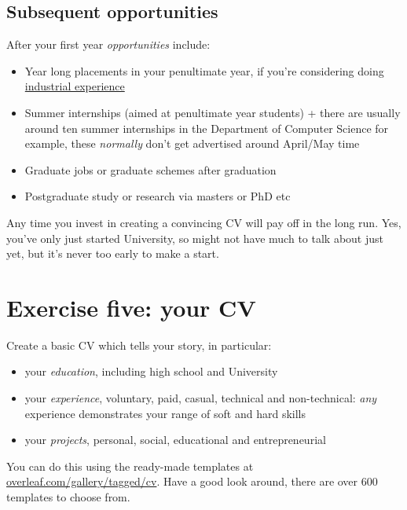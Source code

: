 \documentclass[
]{book}
\providecommand{\tightlist}{%
  \setlength{\itemsep}{0pt}\setlength{\parskip}{0pt}}
\begin{document}
\hypertarget{afterfirst}{%
\subsection{Subsequent opportunities}\label{afterfirst}}

After your first year \emph{opportunities} include:

\begin{itemize}
\tightlist
\item
  Year long placements in your penultimate year, if you're considering doing \href{http://studentnet.cs.manchester.ac.uk/employment/placement/}{industrial experience}
\item
  Summer internships (aimed at penultimate year students)
  + there are usually around ten summer internships in the Department of Computer Science for example, these \emph{normally} don't get advertised around April/May time
\item
  Graduate jobs or graduate schemes after graduation
\item
  Postgraduate study or research via masters or PhD etc
\end{itemize}

Any time you invest in creating a convincing CV will pay off in the long run. Yes, you've only just started University, so might not have much to talk about just yet, but it's never too early to make a start.

\hypertarget{ex5}{%
\section{Exercise five: your CV}\label{ex5}}

Create a basic CV which tells your story, in particular:

\begin{itemize}
\tightlist
\item
  your \emph{education}, including high school and University
\item
  your \emph{experience}, voluntary, paid, casual, technical and non-technical: \emph{any} experience demonstrates your range of soft and hard skills
\item
  your \emph{projects}, personal, social, educational and entrepreneurial
\end{itemize}

You can do this using the ready-made templates at \href{https://www.overleaf.com/gallery/tagged/cv}{overleaf.com/gallery/tagged/cv}. Have a good look around, there are over 600 templates to choose from.
\end{document}
